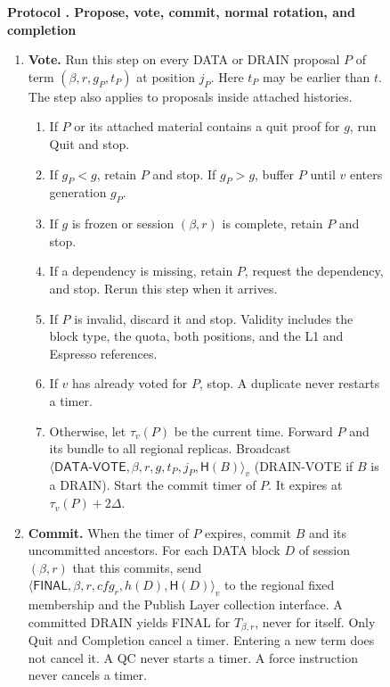 \documentclass[11pt,a4paper]{article}
\newcommand{\RR}[1]{{\color{rrRed}#1}}
\newcommand{\Hash}{\mathsf H}
\newcommand{\tagg}[1]{\ensuremath{\mathsf{#1}}}
\newcounter{protocol}
\newenvironment{protocol}[3][htbp]{\begin{figure}[#1]\refstepcounter{protocol}\label{#2}
\begin{mdframed}[linewidth=.6pt,skipabove=0pt,skipbelow=0pt,
innertopmargin=7pt,innerbottommargin=7pt]\small
\textbf{Protocol \theprotocol. #3}\par\smallskip}{\end{mdframed}\end{figure}}
\begin{document}
\begin{protocol}{alg:steady}{Propose, vote, commit, normal rotation\RR{, and completion}}
\begin{enumerate}[label=\textbf{\arabic*)},itemsep=3pt]
\item \textbf{Vote.} Run this step on every DATA \RR{or DRAIN} proposal
$P$ of term $(\beta,r,g_P,t_P)$ at position $j_P$. Here $t_P$ may be earlier
than $t$. The step also applies to proposals inside attached histories.
 \begin{enumerate}[label=(\alph*)]
 \item If $P$ or its attached material contains a quit proof for $g$,
       run Quit and stop.
 \item If $g_P<g$, retain $P$ and stop. If $g_P>g$, buffer $P$
       until $v$ enters generation $g_P$.
 \item If $g$ is frozen \RR{or session $(\beta,r)$ is complete}, retain $P$ and
       stop.
 \item If a dependency is missing, retain $P$, request the dependency,
       and stop. Rerun this step when it arrives.
 \item If $P$ is invalid, discard it and stop. \RR{Validity includes the
       block type, the quota, both positions, and the L1 and Espresso references.}
 \item If $v$ has already voted for $P$, stop.
       A duplicate never restarts a timer.
 \item Otherwise, let $\tau_v(P)$ be the current time. Forward $P$ and
       its bundle to all \RR{regional replicas. }
       Broadcast
       $\langle\tagg{DATA\mbox{-}VOTE},\beta,r,g,t_P,j_P,\Hash(B)\rangle_v$
       \RR{(DRAIN-VOTE if $B$ is a DRAIN)}.
       Start the commit timer of $P$. It expires at $\tau_v(P)+2\Delta$.
 \end{enumerate}

\item \textbf{Commit.} When the timer of $P$ expires, commit $B$ and
its uncommitted ancestors. \RR{For each DATA block $D$ of session $(\beta,r)$
that this commits, send
$\langle\tagg{FINAL},\beta,r,\mathit{cfg}_r,h(D),\Hash(D)\rangle_v$ to the regional fixed membership and the Publish Layer collection interface. A committed DRAIN yields FINAL for $T_{\beta,r}$, never for
itself. } Only Quit \RR{and Completion} cancel a timer. Entering a
new term does not cancel it. A QC never starts a timer. \RR{A force
instruction never cancels a timer.}


\end{enumerate}
\end{protocol}
\end{document}
